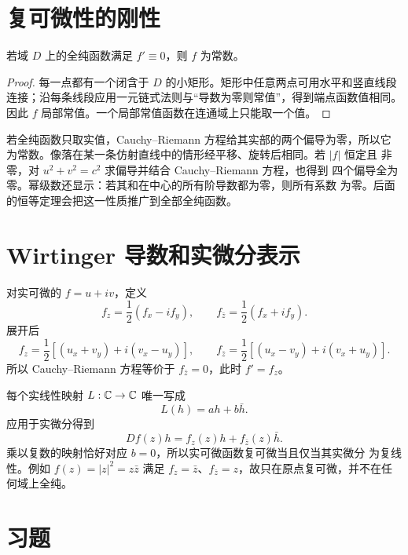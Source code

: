 \section{复可微性的刚性}

\begin{proposition}
\label{prop:zero-derivative-holomorphic-constant}
若域 \(D\) 上的全纯函数满足 \(f'\equiv0\)，则 \(f\) 为常数。
\end{proposition}

\begin{proof}
每一点都有一个闭含于 \(D\) 的小矩形。矩形中任意两点可用水平和竖直线段
连接；沿每条线段应用一元链式法则与“导数为零则常值”，得到端点函数值相同。
因此 \(f\) 局部常值。一个局部常值函数在连通域上只能取一个值。
\end{proof}

若全纯函数只取实值，Cauchy--Riemann 方程给其实部的两个偏导为零，所以它
为常数。像落在某一条仿射直线中的情形经平移、旋转后相同。若 \(|f|\) 恒定且
非零，对 \(u^2+v^2=c^2\) 求偏导并结合 Cauchy--Riemann 方程，也得到
四个偏导全为零。幂级数还显示：若其和在中心的所有阶导数都为零，则所有系数
为零。后面的恒等定理会把这一性质推广到全部全纯函数。

\section{Wirtinger 导数和实微分表示}

对实可微的 \(f=u+iv\)，定义
\[
 f_z=\frac12(f_x-if_y),\qquad
 f_{\bar z}=\frac12(f_x+if_y).
\]
展开后
\[
 f_z=\frac12[(u_x+v_y)+i(v_x-u_y)],\qquad
 f_{\bar z}=\frac12[(u_x-v_y)+i(v_x+u_y)].
\]
所以 Cauchy--Riemann 方程等价于 \(f_{\bar z}=0\)，此时 \(f'=f_z\)。

每个实线性映射 \(L:\mathbb{C}\to\mathbb{C}\) 唯一写成
\[
 L(h)=ah+b\bar h.
\]
应用于实微分得到
\begin{equation}
 Df(z)h=f_z(z)h+f_{\bar z}(z)\bar h.
 \label{eq:wirtinger-real-differential}
\end{equation}
乘以复数的映射恰好对应 \(b=0\)，所以实可微函数复可微当且仅当其实微分
为复线性。例如 \(f(z)=|z|^2=z\bar z\) 满足
\(f_z=\bar z\)、\(f_{\bar z}=z\)，故只在原点复可微，并不在任何域上全纯。

\section*{习题}
